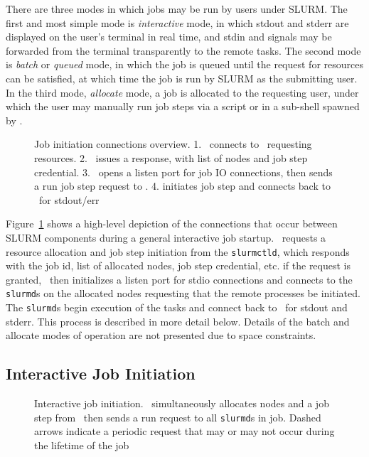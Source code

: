 \documentclass[10pt,onecolumn,times]{../common/llncs}
\begin{document}
{There are three modes in which jobs may be run by users under SLURM. The
first and most simple mode is {\em interactive} mode, in which stdout and
stderr are displayed on the user's terminal in real time, and stdin and
signals may be forwarded from the  terminal transparently to the remote
tasks. The second mode is {\em batch} or {\em queued} mode, in which the job is
queued until the request for resources can be satisfied, at which time the
job is run by SLURM as the submitting user. In the third mode, {\em allocate} 
mode, a job is allocated to the requesting user, under which the user may
manually run job steps via a script or in a sub-shell spawned by \srun .

\begin{figure}[tb]
\centerline{}
\caption{\small Job initiation connections overview. 1. \srun\ connects to 
         \slurmctld\ requesting resources. 2. \slurmctld\ issues a response,
	 with list of nodes and job step credential. 3. \srun\ opens a listen
	 port for job IO connections, then sends a run job step
	 request to \slurmd . 4. \slurmd initiates job step and connects
	 back to \srun\ for stdout/err }
\label{connections}
\end{figure}

Figure~\ref{connections} shows a high-level depiction of the connections
that occur between SLURM components during a general interactive
job startup.  \srun\ requests a resource allocation and job step
initiation from the {\tt slurmctld}, which responds with the job id,
list of allocated nodes, job step credential, etc.  if the request is granted,
\srun\ then initializes a listen port for stdio connections and connects
to the {\tt slurmd}s on the allocated nodes requesting that the remote
processes be initiated. The {\tt slurmd}s begin execution of the tasks and
connect back to \srun\ for stdout and stderr. This process is described 
in more detail below. Details of the batch and allocate modes of operation 
are not presented due to space constraints.

\subsection{Interactive Job Initiation}

\begin{figure}[tb]
\centerline{ }
\caption{\small Interactive job initiation. \srun\ simultaneously allocates
	 nodes and a job step from \slurmctld\ then sends a run request to all
	 {\tt slurmd}s in job. Dashed arrows indicate a periodic request that
	 may or may not occur during the lifetime of the job}
\label{init-interactive}
\end{figure}

}
\end{document}
